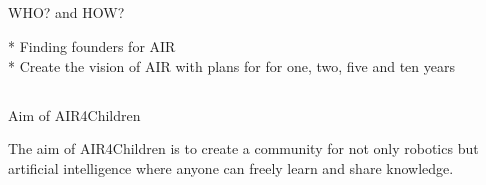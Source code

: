 \documentclass[compress]{beamer}
\begin{document}
\subsection{}
{
\begin{frame}{WHO? and HOW?}


* Finding founders for AIR   \\
* Create the vision of AIR with plans for for one, two, five and ten years


\end{frame}
}



\subsection{}



\subsection{}
{
\begin{frame}{Aim of AIR4Children}

The aim of AIR4Children is to create a community for not only robotics but artificial intelligence 
where anyone can freely learn and share knowledge.


\end{frame}
}





%
%
%
%



\end{document}
